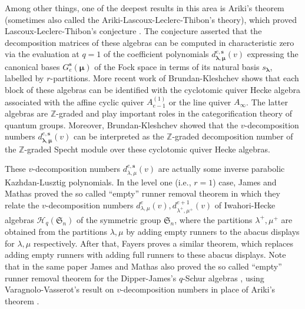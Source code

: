 \documentclass[a4paper,10pt]{amsart}
\theoremstyle{plain}
\renewcommand{\H}{\mathcal{H}}
\newcommand{\lam}{\lambda}
\def\bs{{\boldsymbol{s}}}
\def\Z{{\mathbb Z}}
\def\blam{{\boldsymbol \lambda}}
\def\bmu{{\boldsymbol \mu}}
\def\Sym{\mathfrak{S}}
\theoremstyle{plain}
\numberwithin{equation}{section}
\begin{document}
Among other things, one of the deepest results in this area is Ariki's theorem \cite[Theorem 4.4]{A1} (sometimes also called the Ariki-Lascoux-Leclerc-Thibon's theory), which proved Lascoux-Leclerc-Thibon's conjecture \cite[Conjecture 6.9]{LLT96}. The conjecture asserted that the decomposition matrices of these algebras can be computed in characteristic zero via the evaluation at $q=1$ of the coefficient polynomials $d^{e,\bs}_{\blam,\bmu}(v)$ expressing the canonical bases $G_e^{\bs}(\bmu)$ of the Fock space in terms of its natural basis $s_\blam$, labelled by $r$-partitions. More recent work of Brundan-Kleshchev \cite[Theorem 1.1]{BrundanKleshchev09} shows that each block of these algebras can be identified with the cyclotomic quiver Hecke algebra associated with the affine cyclic quiver $A_{e-1}^{(1)}$ or the line quiver $A_{\infty}$. The latter algebras are $\Z$-graded and play important roles in the categorification theory of quantum groups. Moreover, Brundan-Kleshchev \cite[Theorems 5.3,5.6]{BK:GradedDecomp} showed that the $v$-decomposition numbers $d^{e,\bs}_{\blam,\bmu}(v)$ can be interpreted as the $\Z$-graded decomposition number of the $\Z$-graded Specht module over these cyclotomic quiver Hecke algebras.

These $v$-decomposition numbers $d^{e,\bs}_{\lam,\mu}(v)$ are actually some inverse parabolic Kazhdan-Lusztig polynomials. In the level one (i.e., $r=1$) case, James and Mathas \cite{JM} proved the so called ``empty'' runner removal theorem in which they relate the $v$-decomposition numbers $d^e_{\lam,\mu}(v), d^{e+1}_{\lam^+,\mu^+}(v)$ of Iwahori-Hecke algebras $\H_q(\Sym_n)$ of the symmetric group $\Sym_n$, where the partitions $\lam^+, \mu^+$ are obtained from the partitions $\lam,\mu$ by adding empty runners to the abacus displays for $\lam, \mu$ respectively. After that, Fayers \cite{Fay08} proves a similar theorem, which replaces adding empty runners with adding full runners to these abacus displays. Note that in the same paper \cite{JM} James and Mathas also proved the so called ``empty'' runner removal theorem for the Dipper-James's $q$-Schur algebras \cite{DJ}, using Varagnolo-Vasserot's result \cite[Theorem 6.3]{VV} on $v$-decomposition numbers in place of Ariki's theorem \cite[Theorem 4.4]{A1}.
\end{document}
